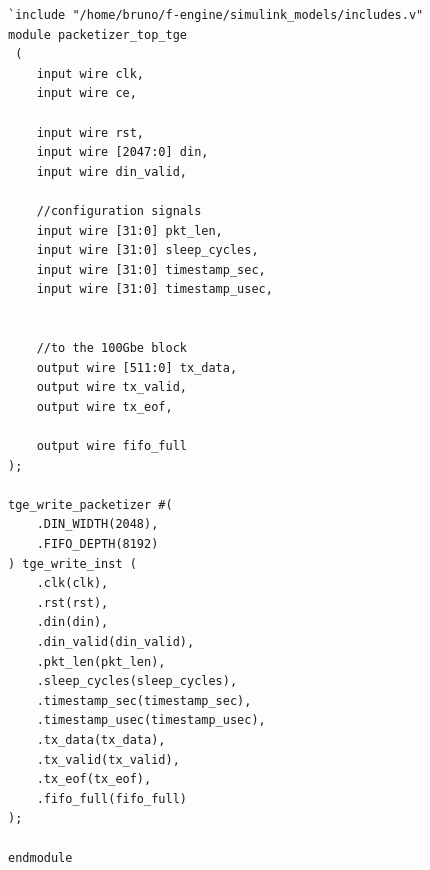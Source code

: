 \begin{lstlisting}[style={prettyverilog}, caption={Verilog code for the top-level packetizer module used in the HGE write path.}, label={lst:verilog_packetizer_top}]
`include "/home/bruno/f-engine/simulink_models/includes.v"
module packetizer_top_tge
 (
    input wire clk,
    input wire ce,

    input wire rst,
    input wire [2047:0] din,
    input wire din_valid,
    
    //configuration signals
    input wire [31:0] pkt_len,
    input wire [31:0] sleep_cycles,
    input wire [31:0] timestamp_sec,  
    input wire [31:0] timestamp_usec, 


    //to the 100Gbe block
    output wire [511:0] tx_data,
    output wire tx_valid,
    output wire tx_eof,

    output wire fifo_full
);

tge_write_packetizer #(
    .DIN_WIDTH(2048),
    .FIFO_DEPTH(8192)
) tge_write_inst (
    .clk(clk),
    .rst(rst),
    .din(din),
    .din_valid(din_valid),
    .pkt_len(pkt_len),
    .sleep_cycles(sleep_cycles),
    .timestamp_sec(timestamp_sec),  
    .timestamp_usec(timestamp_usec), 
    .tx_data(tx_data),
    .tx_valid(tx_valid),
    .tx_eof(tx_eof),
    .fifo_full(fifo_full)
);

endmodule
\end{lstlisting}